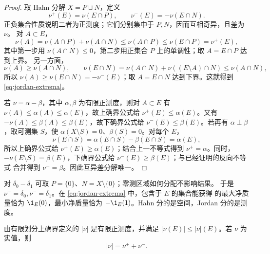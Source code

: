 \begin{proof}
取 Hahn 分解 $X=P\sqcup N$，定义
\[
 \nu^+(E)=\nu(E\cap P),\qquad
 \nu^-(E)=-\nu(E\cap N).
\]
正负集合性质说明二者为正测度；它们分别集中于 $P,N$，因而互相奇异，且差为 $\nu$。
对 $A\subset E$，
\[
 \nu(A)=\nu(A\cap P)+\nu(A\cap N)
 \le\nu(A\cap P)\le\nu(E\cap P)=\nu^+(E),
\]
其中第一步用 $\nu(A\cap N)\le0$，第二步用正集合 $P$ 上的单调性；取 $A=E\cap P$ 达到上界。
另一方面，
\[
 \nu(A)\ge\nu(A\cap N),
 \qquad
 \nu(E\cap N)=\nu(A\cap N)+\nu((E\setminus A)\cap N)
 \le\nu(A\cap N),
\]
所以 $\nu(A)\ge\nu(E\cap N)=-\nu^-(E)$；取 $A=E\cap N$ 达到下界。这就得到
\eqref{eq:jordan-extrema}。

若 $\nu=\alpha-\beta$，其中 $\alpha,\beta$ 为有限正测度，则对 $A\subset E$ 有
$\nu(A)\le\alpha(A)\le\alpha(E)$，故上确界公式给 $\nu^+(E)\le\alpha(E)$。又有
$-\nu(A)\le\beta(A)\le\beta(E)$，故下确界公式给 $\nu^-(E)\le\beta(E)$。若再有
$\alpha\perp\beta$，取可测集 $S$，使
$\alpha(X\setminus S)=0$、$\beta(S)=0$。对每个 $E$，
\[
 \nu(E\cap S)=\alpha(E\cap S)-\beta(E\cap S)=\alpha(E),
\]
所以上确界公式给 $\nu^+(E)\ge\alpha(E)$；结合上一不等式得到 $\nu^+=\alpha$。同时，
$-\nu(E\setminus S)=\beta(E)$，下确界公式给 $\nu^-(E)\ge\beta(E)$；与已经证明的反向不等式
合并得到 $\nu^-=\beta$。因此互异差分解唯一。
\end{proof}

\begin{remark}[回到两个原子]
对 $\delta_0-\delta_1$ 可取 $P=\{0\}$、$N=X\setminus\{0\}$；零测区域如何分配不影响结果。
于是 $\nu^+=\delta_0,\nu^-=\delta_1$。在 \eqref{eq:jordan-extrema} 中，包含于 $E$ 的集合能获得
的最大净质量恰为 $\1_E(0)$，最小净质量恰为 $-\1_E(1)$。Hahn 分的是空间，Jordan 分的是测度。
\end{remark}

\begin{theorem}[全变差测度]\label{theorem:2-2-3-3}
由有限划分上确界定义的 $|\nu|$ 是有限正测度，并满足
$|\nu(E)|\le|\nu|(E)$。若 $\nu$ 为实值，则
\[
 |\nu|=\nu^++\nu^-.
\]
\end{theorem}

